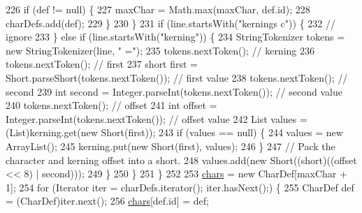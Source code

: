 \begin{DoxyCode}
226                         \textcolor{keywordflow}{if} (def != null) \{
227                             maxChar = Math.max(maxChar, def.id);
228                             charDefs.add(def);
229                         \}
230                     \}
231                     \textcolor{keywordflow}{if} (line.startsWith(\textcolor{stringliteral}{"kernings c"})) \{
232                         \textcolor{comment}{// ignore}
233                     \} \textcolor{keywordflow}{else} \textcolor{keywordflow}{if} (line.startsWith(\textcolor{stringliteral}{"kerning"})) \{
234                         StringTokenizer tokens = \textcolor{keyword}{new} StringTokenizer(line, \textcolor{stringliteral}{" ="});
235                         tokens.nextToken(); \textcolor{comment}{// kerning}
236                         tokens.nextToken(); \textcolor{comment}{// first}
237                         \textcolor{keywordtype}{short} first = Short.parseShort(tokens.nextToken()); \textcolor{comment}{// first value}
238                         tokens.nextToken(); \textcolor{comment}{// second}
239                         \textcolor{keywordtype}{int} second = Integer.parseInt(tokens.nextToken()); \textcolor{comment}{// second value}
240                         tokens.nextToken(); \textcolor{comment}{// offset}
241                         \textcolor{keywordtype}{int} offset = Integer.parseInt(tokens.nextToken()); \textcolor{comment}{// offset value}
242                         List values = (List)kerning.get(\textcolor{keyword}{new} Short(first));
243                         \textcolor{keywordflow}{if} (values == null) \{
244                             values = \textcolor{keyword}{new} ArrayList();
245                             kerning.put(\textcolor{keyword}{new} Short(first), values);
246                         \}
247                         \textcolor{comment}{// Pack the character and kerning offset into a short.}
248                         values.add(\textcolor{keyword}{new} Short((\textcolor{keywordtype}{short})((offset << 8) | second)));
249                     \}
250                 \}
251             \}
252 
253             \mbox{\hyperlink{classorg_1_1newdawn_1_1slick_1_1_angel_code_font_acdb3d26438f0f30d33db0a543715a3b1}{chars}} = \textcolor{keyword}{new} CharDef[maxChar + 1];
254             \textcolor{keywordflow}{for} (Iterator iter = charDefs.iterator(); iter.hasNext();) \{
255                 CharDef def = (CharDef)iter.next();
256                 \mbox{\hyperlink{classorg_1_1newdawn_1_1slick_1_1_angel_code_font_acdb3d26438f0f30d33db0a543715a3b1}{chars}}[def.id] = def;

\end{DoxyCode}
